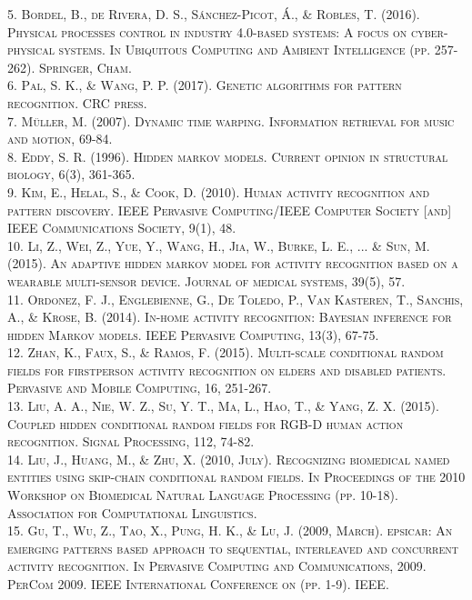 \documentclass{article}
\begin{document}
\begin{thebibliography}{X}
\textsc{5. Bordel, B., de Rivera, D. S., Sánchez-Picot, Á., \& Robles, T. (2016). Physical processes control in industry 4.0-based systems: A focus on cyber-physical systems. In Ubiquitous Computing and Ambient Intelligence (pp. 257-262). Springer, Cham.}\\
\textsc{6. Pal, S. K., \& Wang, P. P. (2017). Genetic algorithms for pattern recognition. CRC press.}\\
\textsc{7. Müller, M. (2007). Dynamic time warping. Information retrieval for music and motion, 69-84.}\\
\textsc{8. Eddy, S. R. (1996). Hidden markov models. Current opinion in structural biology, 6(3), 361-365.}\\
\textsc{9. Kim, E., Helal, S., \& Cook, D. (2010). Human activity recognition and pattern discovery. IEEE Pervasive Computing/IEEE Computer Society [and] IEEE Communications Society, 9(1), 48.}\\
\textsc{10. Li, Z., Wei, Z., Yue, Y., Wang, H., Jia, W., Burke, L. E., ... \& Sun, M. (2015). An adaptive hidden markov model for activity recognition based on a wearable multi-sensor device. Journal of medical systems, 39(5), 57.}\\
\textsc{11. Ordonez, F. J., Englebienne, G., De Toledo, P., Van Kasteren, T., Sanchis, A., \& Krose, B. (2014). In-home activity recognition: Bayesian inference for hidden Markov models. IEEE Pervasive Computing, 13(3), 67-75.}\\
\textsc{12. Zhan, K., Faux, S., \& Ramos, F. (2015). Multi-scale conditional random fields for firstperson activity recognition on elders and disabled patients. Pervasive and Mobile Computing, 16, 251-267.}\\
\textsc{13. Liu, A. A., Nie, W. Z., Su, Y. T., Ma, L., Hao, T., \& Yang, Z. X. (2015). Coupled hidden conditional random fields for RGB-D human action recognition. Signal Processing, 112, 74-82.}\\
\textsc{14. Liu, J., Huang, M., \& Zhu, X. (2010, July). Recognizing biomedical named entities using skip-chain conditional random fields. In Proceedings of the 2010 Workshop on Biomedical Natural Language Processing (pp. 10-18). Association for Computational 
Linguistics.}\\
\textsc{15. Gu, T., Wu, Z., Tao, X., Pung, H. K., \& Lu, J. (2009, March). epsicar: An emerging patterns based approach to sequential, interleaved and concurrent activity recognition. In Pervasive Computing and Communications, 2009. PerCom 2009. IEEE International 
Conference on (pp. 1-9). IEEE.}\\

\end{thebibliography}
\end{document}
